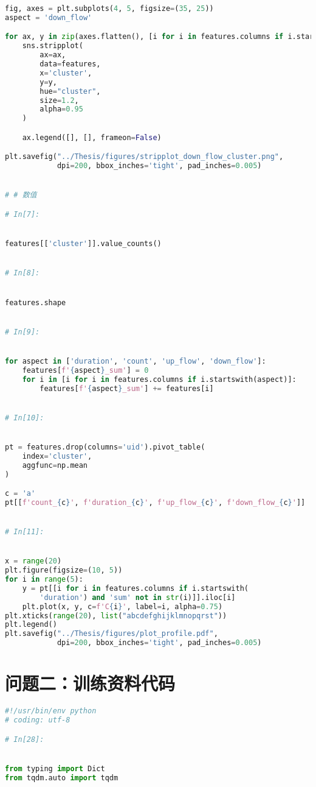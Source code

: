 \documentclass[withoutpreface,bwprint]{cumcmthesis}
\begin{document}
\begin{appendices}
\begin{lstlisting}[language=Python]
fig, axes = plt.subplots(4, 5, figsize=(35, 25))
aspect = 'down_flow'

for ax, y in zip(axes.flatten(), [i for i in features.columns if i.startswith(aspect)]):
    sns.stripplot(
        ax=ax,
        data=features,
        x='cluster',
        y=y,
        hue="cluster",
        size=1.2,
        alpha=0.95
    )

    ax.legend([], [], frameon=False)

plt.savefig("../Thesis/figures/stripplot_down_flow_cluster.png",
            dpi=200, bbox_inches='tight', pad_inches=0.005)


# # 数值

# In[7]:


features[['cluster']].value_counts()


# In[8]:


features.shape


# In[9]:


for aspect in ['duration', 'count', 'up_flow', 'down_flow']:
    features[f'{aspect}_sum'] = 0
    for i in [i for i in features.columns if i.startswith(aspect)]:
        features[f'{aspect}_sum'] += features[i]


# In[10]:


pt = features.drop(columns='uid').pivot_table(
    index='cluster',
    aggfunc=np.mean
)

c = 'a'
pt[[f'count_{c}', f'duration_{c}', f'up_flow_{c}', f'down_flow_{c}']]


# In[11]:


x = range(20)
plt.figure(figsize=(10, 5))
for i in range(5):
    y = pt[[i for i in features.columns if i.startswith(
        'duration') and 'sum' not in str(i)]].iloc[i]
    plt.plot(x, y, c=f'C{i}', label=i, alpha=0.75)
plt.xticks(range(20), list("abcdefghijklmnopqrst"))
plt.legend()
plt.savefig("../Thesis/figures/plot_profile.pdf",
            dpi=200, bbox_inches='tight', pad_inches=0.005)
    \end{lstlisting}

    \section{问题二：训练资料代码}

    \begin{lstlisting}[language=Python]
#!/usr/bin/env python
# coding: utf-8

# In[28]:


from typing import Dict
from tqdm.auto import tqdm


\end{lstlisting}
\end{appendices}
\end{document}
